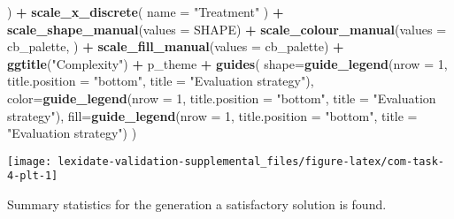 \documentclass[
]{book}
\newenvironment{Shaded}{\begin{snugshade}}{\end{snugshade}}
\newcommand{\AttributeTok}[1]{\textcolor[rgb]{0.13,0.29,0.53}{#1}}
\newcommand{\DecValTok}[1]{\textcolor[rgb]{0.00,0.00,0.81}{#1}}
\newcommand{\FunctionTok}[1]{\textcolor[rgb]{0.13,0.29,0.53}{\textbf{#1}}}
\newcommand{\NormalTok}[1]{#1}
\newcommand{\SpecialCharTok}[1]{\textcolor[rgb]{0.81,0.36,0.00}{\textbf{#1}}}
\newcommand{\StringTok}[1]{\textcolor[rgb]{0.31,0.60,0.02}{#1}}
\begin{document}
\begin{Shaded}
\begin{Highlighting}[]
\NormalTok{  ) }\SpecialCharTok{+}
  \FunctionTok{scale\_x\_discrete}\NormalTok{(}
    \AttributeTok{name =} \StringTok{"Treatment"}
\NormalTok{  ) }\SpecialCharTok{+}
  \FunctionTok{scale\_shape\_manual}\NormalTok{(}\AttributeTok{values =}\NormalTok{ SHAPE) }\SpecialCharTok{+}
  \FunctionTok{scale\_colour\_manual}\NormalTok{(}\AttributeTok{values =}\NormalTok{ cb\_palette, ) }\SpecialCharTok{+}
  \FunctionTok{scale\_fill\_manual}\NormalTok{(}\AttributeTok{values =}\NormalTok{ cb\_palette) }\SpecialCharTok{+}
  \FunctionTok{ggtitle}\NormalTok{(}\StringTok{"Complexity"}\NormalTok{) }\SpecialCharTok{+}
\NormalTok{  p\_theme }\SpecialCharTok{+}
  \FunctionTok{guides}\NormalTok{(}
    \AttributeTok{shape=}\FunctionTok{guide\_legend}\NormalTok{(}\AttributeTok{nrow =} \DecValTok{1}\NormalTok{, }\AttributeTok{title.position =} \StringTok{"bottom"}\NormalTok{,}
                       \AttributeTok{title =} \StringTok{"Evaluation strategy"}\NormalTok{),}
    \AttributeTok{color=}\FunctionTok{guide\_legend}\NormalTok{(}\AttributeTok{nrow =} \DecValTok{1}\NormalTok{, }\AttributeTok{title.position =} \StringTok{"bottom"}\NormalTok{,}
                       \AttributeTok{title =} \StringTok{"Evaluation strategy"}\NormalTok{),}
    \AttributeTok{fill=}\FunctionTok{guide\_legend}\NormalTok{(}\AttributeTok{nrow =} \DecValTok{1}\NormalTok{, }\AttributeTok{title.position =} \StringTok{"bottom"}\NormalTok{,}
                      \AttributeTok{title =} \StringTok{"Evaluation strategy"}\NormalTok{)}
\NormalTok{  )}
\end{Highlighting}
\end{Shaded}

\texttt{[image: lexidate-validation-supplemental\_files/figure-latex/com-task-4-plt-1]}

Summary statistics for the generation a satisfactory solution is found.
\end{document}
